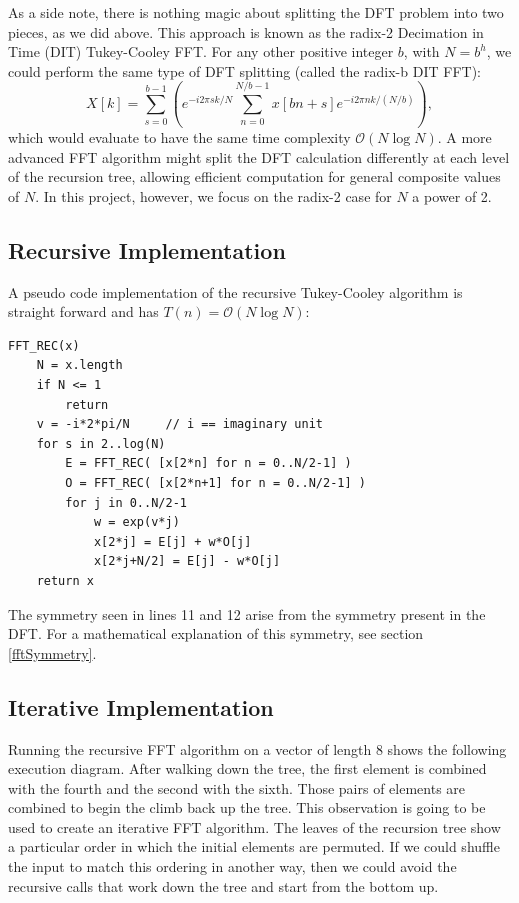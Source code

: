 As a side note, there is nothing magic about splitting the DFT problem into two pieces, as we did above. This approach is known as the radix-2 Decimation in Time (DIT) Tukey-Cooley FFT. For any other positive integer $b$, with $N = b^h$, we could perform the same type of DFT splitting (called the radix-b DIT FFT):
\[
X[k] = \sum_{s=0}^{b-1} \left( e^{-i2\pi s k/N}\sum_{n=0}^{N/b-1}x[bn+s]e^{-i2\pi n k /(N/b)} \right),
\]
which would evaluate to have the same time complexity $\mathcal{O}(N\log N)$. A more advanced FFT algorithm might split the DFT calculation differently at each level of the recursion tree, allowing efficient computation for general composite values of $N$. In this project, however, we focus on the radix-2 case for $N$ a power of 2.

\subsection{Recursive Implementation}
\label{fftRecursive}
A pseudo code implementation of the recursive Tukey-Cooley algorithm is straight forward and has $T(n) = \mathcal{O}(N \log N)$:
\pagebreak
\begin{lstlisting}
FFT_REC(x)
    N = x.length
    if N <= 1
        return
    v = -i*2*pi/N     // i == imaginary unit
    for s in 2..log(N)
        E = FFT_REC( [x[2*n] for n = 0..N/2-1] )
        O = FFT_REC( [x[2*n+1] for n = 0..N/2-1] )
        for j in 0..N/2-1
            w = exp(v*j)
            x[2*j] = E[j] + w*O[j]
            x[2*j+N/2] = E[j] - w*O[j]
    return x
\end{lstlisting}

The symmetry seen in lines 11 and 12 arise from the symmetry present in the DFT. For a mathematical explanation of this symmetry, see section \ref{fftSymmetry}. 


\subsection{Iterative Implementation}
Running the recursive FFT algorithm on a vector of length 8 shows the following execution diagram. After walking down the tree, the first element is combined with the fourth and the second with the sixth. Those pairs of elements are combined to begin the climb back up the tree. This observation is going to be used to create an iterative FFT algorithm. The leaves of the recursion tree show a particular order in which the initial elements are permuted. If we could shuffle the input to match this ordering in another way, then we could avoid the recursive calls that work down the tree and start from the bottom up.

